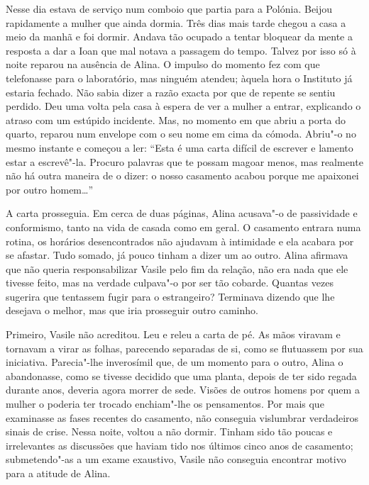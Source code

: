 Nesse dia estava de serviço num comboio que partia para a Polónia.
Beijou rapidamente a mulher que ainda dormia. Três dias mais tarde
chegou a casa a meio da manhã e foi dormir. Andava tão ocupado a tentar
bloquear da mente a resposta a dar a Ioan que mal notava a passagem do
tempo. Talvez por isso só à noite reparou na ausência de Alina. O
impulso do momento fez com que telefonasse para o laboratório, mas
ninguém atendeu; àquela hora o Instituto já estaria fechado. Não sabia
dizer a razão exacta por que de repente se sentiu perdido. Deu uma volta
pela casa à espera de ver a mulher a entrar, explicando o atraso com um
estúpido incidente. Mas, no momento em que abriu a porta do quarto,
reparou num
envelope com o seu nome em cima da cómoda. Abriu"-o no mesmo instante e
começou a ler: ``Esta é uma carta difícil de escrever e lamento estar a
escrevê"-la. Procuro palavras que te possam magoar menos, mas realmente
não há outra maneira de o dizer: o nosso casamento acabou porque me
apaixonei por outro homem\ldots{}''

A carta prosseguia. Em cerca de duas páginas, Alina acusava"-o de
passividade e conformismo, tanto na vida de casada como em geral. O
casamento entrara numa rotina, os horários desencontrados não ajudavam à
intimidade e ela acabara por se afastar. Tudo somado, já pouco tinham a
dizer um ao outro. Alina afirmava que não queria responsabilizar
Vasile pelo fim da relação, não era nada que ele tivesse feito, mas na
verdade culpava"-o por ser tão cobarde. Quantas vezes sugerira que
tentassem fugir para o estrangeiro? Terminava dizendo que lhe desejava o
melhor, mas que iria prosseguir outro caminho.

Primeiro, Vasile não acreditou. Leu e releu a carta de pé. As mãos
viravam e tornavam a virar as folhas, parecendo separadas de si, como se
flutuassem por sua iniciativa. Parecia"-lhe inverosímil que, de um
momento para o outro, Alina o abandonasse, como se tivesse decidido que
uma planta, depois de ter sido regada durante anos, deveria agora morrer
de sede. Visões de outros homens por quem a mulher o poderia ter trocado
enchiam"-lhe os pensamentos. Por mais que examinasse as fases recentes
do casamento, não conseguia vislumbrar verdadeiros sinais de crise.
Nessa noite, voltou a não dormir. Tinham sido tão poucas e irrelevantes
as discussões que haviam tido nos últimos cinco anos de casamento;
submetendo"-as a um
exame exaustivo, Vasile não conseguia encontrar motivo para a atitude de
Alina.

